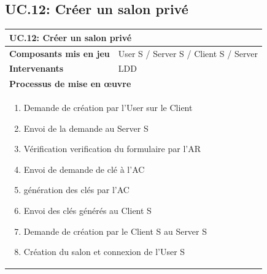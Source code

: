 \documentclass[a4paper,11pt,french]{article}
\begin{document}

\subsection{UC.12: Créer un salon privé}
\begin{center}
	\vspace*{0.7cm}
	\begin{tabularx}{16cm}{|l|X|}
	\hline
	\multicolumn{2}{|l|}{\textbf{UC.12: Créer un salon privé}}\\
	\hline
	\textbf{Composants mis en jeu} & User S / Server S / Client S / Server \\
	\hline
	\textbf{Intervenants} & LDD \\
	\hline
	\multicolumn{2}{|l|}{\textbf{Processus de mise en \oe uvre}}\\
	\hline
	\multicolumn{2}{|p{15cm}|}{\begin{enumerate}\item Demande de création par l'User sur le Client \item Envoi de la demande au Server S \item Vérification verification du formulaire par l'AR \item Envoi de demande de clé à l'AC \item génération des clés par l'AC \item Envoi des clés générés au Client S \item Demande de création par le Client S au Server S \item Création du salon et connexion de l'User S \end{enumerate}}\\
	\hline
	\end{tabularx}
\end{center}
\end{document}
